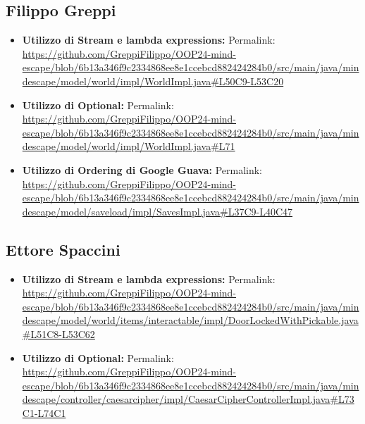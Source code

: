\documentclass[a4paper,12pt]{report}
\begin{document}
\subsection{Filippo Greppi}
%
\begin{itemize}
	\item \textbf{Utilizzo di Stream e lambda expressions:} 
	Permalink: \url{https://github.com/GreppiFilippo/OOP24-mind-escape/blob/6b13a346f9c2334868ee8e1ccebcd882424284b0/src/main/java/mindescape/model/world/impl/WorldImpl.java#L50C9-L53C20}
	\item \textbf{Utilizzo di Optional:}
	Permalink: \url{https://github.com/GreppiFilippo/OOP24-mind-escape/blob/6b13a346f9c2334868ee8e1ccebcd882424284b0/src/main/java/mindescape/model/world/impl/WorldImpl.java#L71}
	\item \textbf{Utilizzo di Ordering di Google Guava:}
	Permalink: \url{https://github.com/GreppiFilippo/OOP24-mind-escape/blob/6b13a346f9c2334868ee8e1ccebcd882424284b0/src/main/java/mindescape/model/saveload/impl/SavesImpl.java#L37C9-L40C47}
\end{itemize}
%
\subsection{Ettore Spaccini}
%
\begin{itemize}
	\item \textbf{Utilizzo di Stream e lambda expressions:} 
	Permalink: \url{https://github.com/GreppiFilippo/OOP24-mind-escape/blob/6b13a346f9c2334868ee8e1ccebcd882424284b0/src/main/java/mindescape/model/world/items/interactable/impl/DoorLockedWithPickable.java#L51C8-L53C62}
	\item \textbf{Utilizzo di Optional:} 
	Permalink: \url{https://github.com/GreppiFilippo/OOP24-mind-escape/blob/6b13a346f9c2334868ee8e1ccebcd882424284b0/src/main/java/mindescape/controller/caesarcipher/impl/CaesarCipherControllerImpl.java#L73C1-L74C1}
\end{itemize}
%
\end{document}
